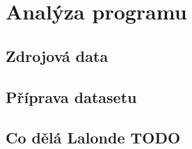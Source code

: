 

\chapter{Analýza programu}

\section{Zdrojová data}

\section{Příprava datasetu}

\section{Co dělá Lalonde TODO}
